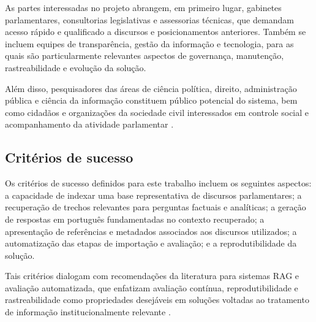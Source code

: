As partes interessadas no projeto abrangem, em primeiro lugar, gabinetes parlamentares, consultorias legislativas e assessorias técnicas, que demandam acesso rápido e qualificado a discursos e posicionamentos anteriores. Também se incluem equipes de transparência, gestão da informação e tecnologia, para as quais são particularmente relevantes aspectos de governança, manutenção, rastreabilidade e evolução da solução.

Além disso, pesquisadores das áreas de ciência política, direito, administração pública e ciência da informação constituem público potencial do sistema, bem como cidadãos e organizações da sociedade civil interessados em controle social e acompanhamento da atividade parlamentar \parencite{martelloteViola2025organizacaoConhecimento,geunis2023parliamentaryMonitoring}.

\subsection{Critérios de sucesso}

Os critérios de sucesso definidos para este trabalho incluem os seguintes aspectos: a capacidade de indexar uma base representativa de discursos parlamentares; a recuperação de trechos relevantes para perguntas factuais e analíticas; a geração de respostas em português fundamentadas no contexto recuperado; a apresentação de referências e metadados associados aos discursos utilizados; a automatização das etapas de importação e avaliação; e a reprodutibilidade da solução.

Tais critérios dialogam com recomendações da literatura para sistemas RAG e avaliação automatizada, que enfatizam avaliação contínua, reprodutibilidade e rastreabilidade como propriedades desejáveis em soluções voltadas ao tratamento de informação institucionalmente relevante \parencite{gao2023ragSurvey,saadFalconEtAl2024ares,esEtAl2023ragas}.
